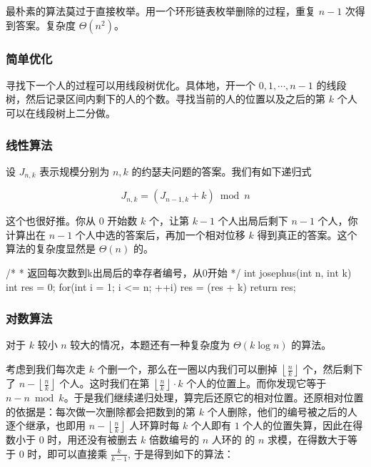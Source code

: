 最朴素的算法莫过于直接枚举。用一个环形链表枚举删除的过程，重复 \(n-1\) 次得到答案。复杂度 \(\Theta (n^2)\)。

\subsubsection{简单优化}\label{ux7b80ux5355ux4f18ux5316}

寻找下一个人的过程可以用线段树优化。具体地，开一个 \(0,1,\cdots, n-1\) 的线段树，然后记录区间内剩下的人的个数。寻找当前的人的位置以及之后的第 \(k\) 个人可以在线段树上二分做。

\subsubsection{线性算法}\label{ux7ebfux6027ux7b97ux6cd5}

设 \(J_{n,k}\) 表示规模分别为 \(n,k\) 的约瑟夫问题的答案。我们有如下递归式

\[
J_{n,k}=(J_{n-1,k}+k)\bmod n
\]

这个也很好推。你从 \(0\) 开始数 \(k\) 个，让第 \(k-1\) 个人出局后剩下 \(n-1\) 个人，你计算出在 \(n-1\) 个人中选的答案后，再加一个相对位移 \(k\) 得到真正的答案。这个算法的复杂度显然是 \(\Theta (n)\) 的。


\begin{codeline}
/*
 * 返回每次数到k出局后的幸存者编号，从0开始
 */
int josephus(int n, int k) {
    int res = 0;
    for(int i = 1; i <= n; ++i) {
        res = (res + k) %
    }
    return res;
}
\end{codeline}


\subsubsection{对数算法}\label{ux5bf9ux6570ux7b97ux6cd5}

对于 \(k\) 较小 \(n\) 较大的情况，本题还有一种复杂度为 \(\Theta (k\log n)\) 的算法。

考虑到我们每次走 \(k\) 个删一个，那么在一圈以内我们可以删掉 \(\left\lfloor\frac{n}{k}\right\rfloor\) 个，然后剩下了 \(n-\left\lfloor\frac{n}{k}\right\rfloor\) 个人。这时我们在第 \(\left\lfloor\frac{n}{k}\right\rfloor\cdot k\) 个人的位置上。而你发现它等于 \(n-n\bmod k\)。于是我们继续递归处理，算完后还原它的相对位置。还原相对位置的依据是：每次做一次删除都会把数到的第 \(k\) 个人删除，他们的编号被之后的人逐个继承，也即用 \(n-\left\lfloor\frac{n}{k}\right\rfloor\) 人环算时每 \(k\) 个人即有 \(1\) 个人的位置失算，因此在得数小于 \(0\) 时，用还没有被删去 \(k\) 倍数编号的 \(n\) 人环的 的 \(n\) 求模，在得数大于等于 \(0\) 时，即可以直接乘 \(\frac{k}{k-1}\), 于是得到如下的算法：


